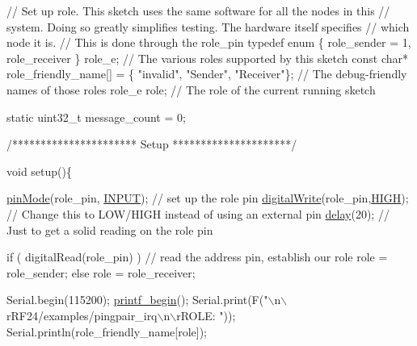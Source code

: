 \begin{DoxyCodeInclude}
\textcolor{comment}{// Set up role.  This sketch uses the same software for all the nodes in this}
\textcolor{comment}{// system.  Doing so greatly simplifies testing.  The hardware itself specifies}
\textcolor{comment}{// which node it is.}
\textcolor{comment}{// This is done through the role\_pin}
\textcolor{keyword}{typedef} \textcolor{keyword}{enum} \{ role\_sender = 1, role\_receiver \} role\_e;                 \textcolor{comment}{// The various roles supported by
       this sketch}
\textcolor{keyword}{const} \textcolor{keywordtype}{char}* role\_friendly\_name[] = \{ \textcolor{stringliteral}{"invalid"}, \textcolor{stringliteral}{"Sender"}, \textcolor{stringliteral}{"Receiver"}\};  \textcolor{comment}{// The debug-friendly names of
       those roles}
role\_e role;                                                            \textcolor{comment}{// The role of the current running
       sketch}

\textcolor{keyword}{static} uint32\_t message\_count = 0;


\textcolor{comment}{/********************** Setup *********************/}

\textcolor{keywordtype}{void} setup()\{

  \hyperlink{group__Porting__General_ga361649efb4f1e2fa3c870ca203497d5e}{pinMode}(role\_pin, \hyperlink{group__Porting__General_ga1bb283bd7893b9855e2f23013891fc82}{INPUT});                        \textcolor{comment}{// set up the role pin                  }
  \hyperlink{group__Porting__General_gabda89b115581947337690b2f85bfab6e}{digitalWrite}(role\_pin,\hyperlink{group__Porting__General_ga5bb885982ff66a2e0a0a45a8ee9c35e2}{HIGH});                     \textcolor{comment}{// Change this to LOW/HIGH instead of
       using an external pin}
  \hyperlink{group__Porting__General_ga70a331e8ddf9acf9d33c47b71cda4c5f}{delay}(20);                                       \textcolor{comment}{// Just to get a solid reading on the role pin}

  \textcolor{keywordflow}{if} ( digitalRead(role\_pin) )                    \textcolor{comment}{// read the address pin, establish our role}
    role = role\_sender;
  \textcolor{keywordflow}{else}
    role = role\_receiver;


  Serial.begin(115200);
  \hyperlink{printf_8h_afc0d9ca32710dff550ebe56ab6b39d23}{printf\_begin}();
  Serial.print(F(\textcolor{stringliteral}{"\(\backslash\)n\(\backslash\)rRF24/examples/pingpair\_irq\(\backslash\)n\(\backslash\)rROLE: "}));
  Serial.println(role\_friendly\_name[role]);


\end{DoxyCodeInclude}
